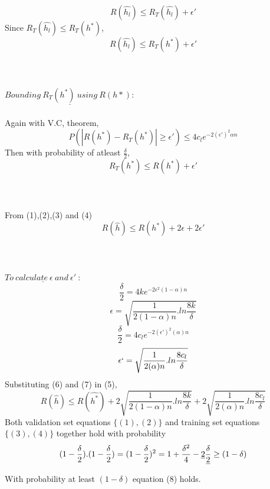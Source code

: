 \documentclass[17pt]{article}
\begin{document}
$$ R(\hat{h_l}) \leq R_T(\hat{h_l}) + \epsilon '$$
Since $R_T(\hat{h_l}) \leq R_T(h^*)$,
\begin{equation}
R(\hat{h_l}) \leq R_T(h^*) + \epsilon ' \end{equation}\\
\\\\
$\underline{Bounding\: R_T(h^*)\: using\:  R(h*):}$\\\\
Again with V.C, theorem,
$$ P\left( | R(h^*) - R_T(h^*) | \geq \epsilon ' \right) \leq 4 c_le^{-2{(\epsilon ')}^2\alpha n}$$
Then with probability of atleast $\frac{\delta}{2}$,
\begin{equation}
R_T(h^*) \leq R(h^*) + \epsilon ' \end{equation}\\
\\\\
From (1),(2),(3) and (4)\\
\begin{equation}
R(\hat{h}) \leq R(h^*) + 2\epsilon + 2\epsilon ' 
\end{equation}\\
\\\\
$\underline{To\: calculate\: \epsilon\: and\: \epsilon '\: :}$\\
$$ \frac{\delta}{2} = 4ke^{-2\epsilon^2(1-\alpha)n}$$
\begin{equation}
\epsilon = \sqrt{\frac{1}{2(1-\alpha)n}.ln\frac{8k}{\delta}}
\end{equation}
$$ \frac{\delta}{2} = 4c_le^{-2{(\epsilon ')}^2(\alpha)n}$$
\begin{equation}
\epsilon ` = \sqrt{\frac{1}{2(\alpha)n}.ln\frac{8c_l}{\delta}}
\end{equation}
Substituting (6) and (7) in (5),
\begin{equation}
 R(\hat{h}) \leq R(\hat{h^*}) 
+ 2\sqrt{\frac{1}{2(1-\alpha)n}.ln\frac{8k}{\delta}}
 + 2\sqrt{\frac{1}{2(\alpha)n}.ln\frac{8c_l}{\delta}}
\end{equation}
Both validation set equations $\{(1), (2)\}$ and training set equations $\{(3), (4)\}$ together hold with probability 
$$(1-\frac{\delta}{2}).(1-\frac{\delta}{2}) = (1-\frac{\delta}{2})^2 = 1 + \frac{\delta^2}{4} - \sout{2} \frac{\delta}{\sout{2}} \geq (1-\delta)$$ 
With probability at least $(1-\delta)$ equation (8) holds.
\end{document}
